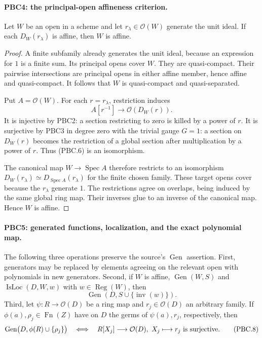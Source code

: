 \documentclass[11pt,a4paper]{article}
\numberwithin{equation}{section}
\theoremstyle{remark}\newtheorem{remark}[theorem]{Remark}
\begin{document}
\paragraph{PBC4: the principal-open affineness criterion.}
\label{claim:PBC4}
Let $W$ be an open in a scheme and let $r_\lambda\in\mathcal O(W)$
generate the unit ideal.  If each $D_W(r_\lambda)$ is affine,
then $W$ is affine.

\begin{proof}
A finite subfamily already generates the unit ideal, because an
expression for $1$ is a finite sum.  Its principal opens cover $W$.
They are quasi-compact.  Their pairwise intersections are principal
opens in either affine member, hence affine and quasi-compact.
It follows that $W$ is quasi-compact and quasi-separated.

Put $A=\mathcal O(W)$.  For each $r=r_\lambda$, restriction induces
\[
 A[r^{-1}]\longrightarrow\mathcal O(D_W(r)).
                                                        \tag{PBC.6}
\]
It is injective by PBC2: a section restricting to zero is killed by a
power of $r$.  It is surjective by PBC3 in degree zero with the
trivial gauge $G=1$: a section on $D_W(r)$ becomes the restriction
of a global section after multiplication by a power of $r$.
Thus (PBC.6) is an isomorphism.

The canonical map $W\to\operatorname{Spec}A$ therefore restricts
to an isomorphism $D_W(r_\lambda)\simeq
D_{\operatorname{Spec}A}(r_\lambda)$ for the finite chosen family.
These target opens cover because the $r_\lambda$ generate $1$.
The restrictions agree on overlaps, being induced by the same
global ring map.  Their inverses glue to an inverse of the
canonical map.  Hence $W$ is affine.
\end{proof}

\paragraph{PBC5: generated functions, localization, and the exact polynomial map.}
\label{claim:PBC5}
The following three operations preserve the source's
$\operatorname{Gen}$ assertion.
First, generators may be replaced by elements agreeing on the
relevant open with polynomials in new generators.
Second, if $W$ is affine,
$\operatorname{Gen}(W,S)$ and
$\operatorname{IsLoc}(D,W,w)$ with $w\in\operatorname{Reg}(W)$,
then
\[
 \operatorname{Gen}(D,S\cup\{\operatorname{inv}(w)\}).
                                                        \tag{PBC.7}
\]
Third, let $\psi:R\to\mathcal O(D)$ be a ring map and
$r_j\in\mathcal O(D)$ an arbitrary family.  If
$\phi(a),\rho_j\in\operatorname{Fn}(Z)$ have on $D$ the germs
of $\psi(a),r_j$, respectively, then
\[
 \operatorname{Gen}\bigl(D,\phi(R)\cup\{\rho_j\}\bigr)
 \quad\Longleftrightarrow\quad
 R[X_j]\longrightarrow\mathcal O(D),\
 X_j\longmapsto r_j
 \ \hbox{is surjective}.
                                                        \tag{PBC.8}
\]
\end{document}

